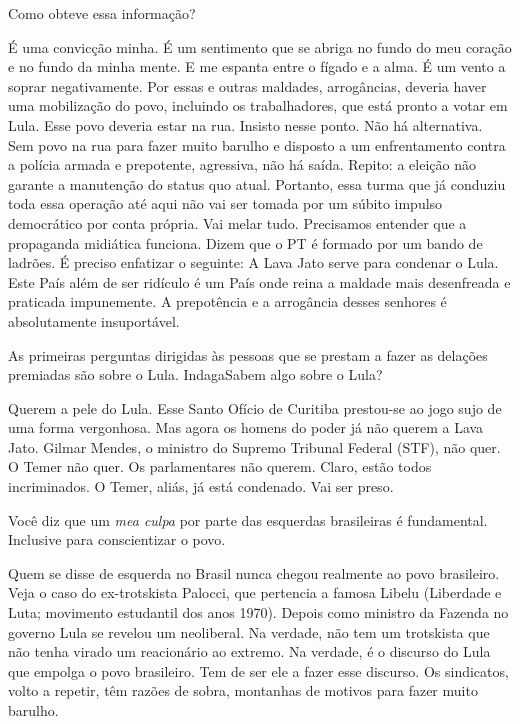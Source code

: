 \falaG Como obteve essa informação?

\falaM É uma convicção minha. É um sentimento que se abriga no fundo do meu
coração e no fundo da minha mente. E me espanta entre o fígado e a alma.
É um vento a soprar negativamente. Por essas e outras maldades,
arrogâncias, deveria haver uma mobilização do povo, incluindo os
trabalhadores, que está pronto a votar em Lula. Esse povo deveria estar
na rua. Insisto nesse ponto. Não há alternativa. Sem povo na rua para
fazer muito barulho e disposto a um enfrentamento contra a polícia
armada e prepotente, agressiva, não há saída. Repito: a eleição não
garante a manutenção do status quo atual. Portanto, essa turma que já
conduziu toda essa operação até aqui não vai ser tomada por um súbito
impulso democrático por conta própria. Vai melar tudo. Precisamos
entender que a propaganda midiática funciona. Dizem que o PT é formado
por um bando de ladrões. É preciso enfatizar o seguinte: A Lava Jato
serve para condenar o Lula. Este País além de ser ridículo é um País
onde reina a maldade mais desenfreada e praticada impunemente. A
prepotência e a arrogância desses senhores é absolutamente insuportável.

\falaG As primeiras perguntas dirigidas às pessoas que se prestam a fazer as
delações premiadas são sobre o Lula. Indaga\falaM Sabem algo sobre o Lula?

\falaM Querem a pele do Lula. Esse Santo Ofício de Curitiba prestou-se ao
jogo sujo de uma forma vergonhosa. Mas agora os homens do poder já não
querem a Lava Jato. Gilmar Mendes, o ministro do Supremo Tribunal
Federal (STF), não quer. O Temer não quer. Os parlamentares não querem.
Claro, estão todos incriminados. O Temer, aliás, já está condenado. Vai
ser preso.

\falaG Você diz que um \emph{mea culpa} por parte das esquerdas brasileiras
é fundamental. Inclusive para conscientizar o povo.

\falaM Quem se disse de esquerda no Brasil nunca chegou realmente ao povo
brasileiro. Veja o caso do ex-trotskista Palocci, que pertencia a famosa
Libelu (Liberdade e Luta; movimento estudantil dos anos 1970). Depois
como ministro da Fazenda no governo Lula se revelou um neoliberal. Na
verdade, não tem um trotskista que não tenha virado um reacionário ao
extremo. Na verdade, é o discurso do Lula que empolga o povo brasileiro.
Tem de ser ele a fazer esse discurso. Os sindicatos, volto a repetir,
têm razões de sobra, montanhas de motivos para fazer muito barulho.

